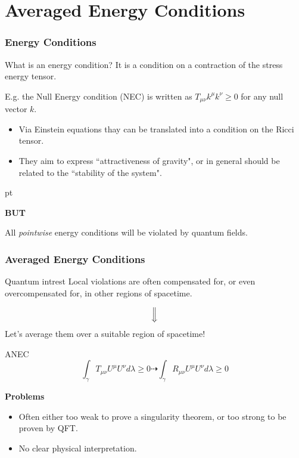 \documentclass[handout]{beamer}
\begin{document}
	\section{Averaged Energy Conditions}
	\begin{frame}
		\frametitle{Energy Conditions}
		\begin{defblock}{What is an energy condition?}
			It is a condition on a contraction of the stress energy tensor.

			E.g. the Null Energy condition (NEC) is written as \(T_{\mu\nu}k^{\mu}k^{\nu} \ge 0\) for any null vector \(k\).
		\end{defblock}
		\begin{itemize}
			\item Via Einstein equations thay can be translated into a condition on the Ricci tensor.
			\item They aim to express ``attractiveness of gravity", or in general should be related to the ``stability of the system".
		\end{itemize}
		 pt 
		\begin{center}
			\textbf{BUT}
		\end{center}
		\begin{ideablock}{}
			\centering
			All \emph{pointwise} energy conditions will be violated by quantum fields.%
		\end{ideablock}
	\end{frame}

	\begin{frame}
		\frametitle{Averaged Energy Conditions}
		\begin{ideablock}{Quantum intrest}
			\centering
			Local violations are often compensated for, or even overcompensated for, in other regions of spacetime.
		\end{ideablock}
		\[
			\Big\Downarrow
		\]
		  Let's average them over a suitable region of spacetime! \emoji{light-bulb} 
		\begin{defblock}{ANEC}
			\[
				\int_{\gamma} T_{\mu\nu}U^{\mu}U^{\nu} d\lambda \ge 0 \dashrightarrow \int_{\gamma}  R_{\mu\nu}U^{\mu}U^{\nu} d\lambda \ge 0
			\]
		\end{defblock}
		\textbf{Problems}
		\begin{itemize}
			\item Often either too weak to prove a singularity theorem, or too strong to be proven by QFT.
			\item No clear physical interpretation.
		\end{itemize}
	\end{frame}
\end{document}
